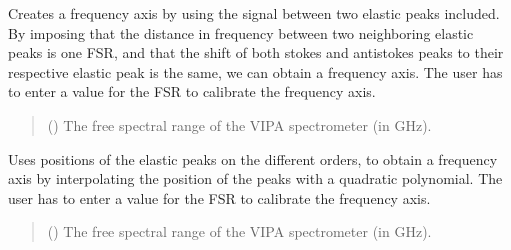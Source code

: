 \documentclass[letterpaper,10pt,english]{sphinxmanual}
\begin{document}
\begin{fulllineitems}
\begin{fulllineitems}
\label{\detokenize{source/HDF5_BLS:HDF5_BLS.analyze.Analyze_VIPA.interpolate_between_one_order}}
\pysigstartsignatures
\pysiglinewithargsret
{}
{}
{}
\pysigstopsignatures
\sphinxAtStartPar
Creates a frequency axis by using the signal between two elastic peaks included. By imposing that the distance in frequency between two neighboring elastic peaks is one FSR, and that the shift of both stokes and anti\sphinxhyphen{}stokes peaks to their respective elastic peak is the same, we can obtain a frequency axis. The user has to enter a value for the FSR to calibrate the frequency axis.
\begin{quote}\begin{description}
\sphinxAtStartPar
{} () \textendash{} The free spectral range of the VIPA spectrometer (in GHz).

\end{description}\end{quote}

\end{fulllineitems}


\begin{fulllineitems}
\label{\detokenize{source/HDF5_BLS:HDF5_BLS.analyze.Analyze_VIPA.interpolate_elastic}}
\pysigstartsignatures
\pysiglinewithargsret
{}
{}
{}
\pysigstopsignatures
\sphinxAtStartPar
Uses positions of the elastic peaks on the different orders, to obtain a frequency axis by interpolating the position of the peaks with a quadratic polynomial. The user has to enter a value for the FSR to calibrate the frequency axis.
\begin{quote}\begin{description}
\sphinxAtStartPar
{} () \textendash{} The free spectral range of the VIPA spectrometer (in GHz).


\end{description}
\end{quote}
\end{fulllineitems}
\end{fulllineitems}
\end{document}
